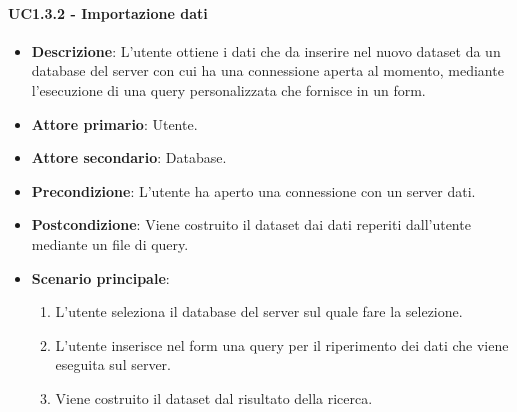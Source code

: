 \paragraph{UC1.3.2 - Importazione dati}
\label{par:uc1.3.2}
\begin{itemize}
    \item \textbf{Descrizione}: L'utente ottiene i dati che da inserire nel nuovo dataset da un database
                                del server con cui ha una connessione aperta al momento, mediante 
                                l'esecuzione di una query personalizzata che fornisce in un form.

    \item \textbf{Attore primario}: Utente.
    
    \item \textbf{Attore secondario}: Database.
    
    \item \textbf{Precondizione}:   L'utente ha aperto una connessione con un server dati.
    \item \textbf{Postcondizione}:  Viene costruito il dataset dai dati reperiti dall'utente mediante un file di query.

	\item \textbf{Scenario principale}:
        \begin{enumerate}
            \item L'utente seleziona il database del server sul quale fare la selezione.
			\item L'utente inserisce nel form una query per il riperimento dei dati che viene eseguita sul server.
			\item Viene costruito il dataset dal risultato della ricerca.
        \end{enumerate}
\end{itemize}



